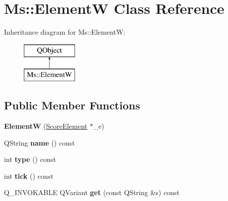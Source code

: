 \hypertarget{class_ms_1_1_element_w}{}\section{Ms\+:\+:ElementW Class Reference}
\label{class_ms_1_1_element_w}
Inheritance diagram for Ms\+:\+:ElementW\+:\begin{figure}[H]
\begin{center}
\leavevmode
\includegraphics[height=2.000000cm]{class_ms_1_1_element_w}
\end{center}
\end{figure}
\subsection*{Public Member Functions}
\begin{DoxyCompactItemize}
\item 
\mbox{\label{class_ms_1_1_element_w_ad5209c3f36c7119ce356462d0db02a1f}} 
{\bfseries ElementW} (\hyperlink{class_ms_1_1_score_element}{Score\+Element} $\ast$\+\_\+e)
\item 
\mbox{\label{class_ms_1_1_element_w_ac2e325982bf1fc89f64d870d111465a2}} 
Q\+String {\bfseries name} () const
\item 
\mbox{\label{class_ms_1_1_element_w_abb40a8da610aba4e6e267218761bc936}} 
int {\bfseries type} () const
\item 
\mbox{\label{class_ms_1_1_element_w_a624581882a2fc504d5a17d7e22864ecd}} 
int {\bfseries tick} () const
\item 
\mbox{\label{class_ms_1_1_element_w_a95cef5a426ffa5184a84f5cb9bb9ddd6}} 
Q\+\_\+\+I\+N\+V\+O\+K\+A\+B\+LE Q\+Variant {\bfseries get} (const Q\+String \&s) const
\end{DoxyCompactItemize}
